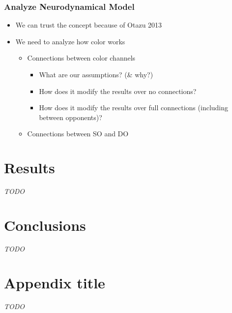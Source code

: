 \documentclass[journal,onecolumn]{IEEEtran}
\begin{document}
\subsubsection{Analyze Neurodynamical Model}
\begin{itemize}
    \item We can trust the concept because of Otazu 2013
    \item We need to analyze how color works
    \begin{itemize}
        \item Connections between color channels
        \begin{itemize}
            \item What are our assumptions? (\& why?)
            \item How does it modify the results over no connections?
            \item How does it modify the results over full connections (including between opponents)?
        \end{itemize}
        \item Connections between SO and DO
    \end{itemize}
\end{itemize}



%
%
%
\section{Results}

\textit{TODO}


%
%
%
\section{Conclusions}

\textit{TODO}


\appendices
\section{Appendix title}
\textit{TODO}
\end{document}
